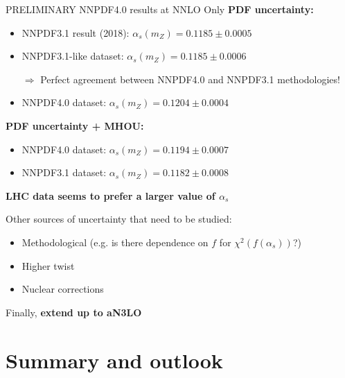 \documentclass[8pt,t]{beamer}
\begin{document}
\begin{frame}{PRELIMINARY NNPDF4.0 results at NNLO}
  Only \textbf{PDF uncertainty:}
  \begin{itemize}
    \item NNPDF3.1 result (2018): $\alpha_s(m_Z) = 0.1185 \pm 0.0005$
    \item NNPDF3.1-like dataset: $\alpha_s(m_Z) = 0.1185 \pm 0.0006$
    \item[$\Rightarrow$] Perfect agreement between NNPDF4.0 and NNPDF3.1 methodologies!
    \item NNPDF4.0 dataset: $\alpha_s(m_Z) = 0.1204 \pm 0.0004$
  \end{itemize}

  \vspace*{1em}
  \textbf{PDF uncertainty + MHOU:}
  \begin{itemize}
    \item NNPDF4.0 dataset: $\alpha_s(m_Z)=0.1194 \pm 0.0007$
    \item NNPDF3.1 dataset: $\alpha_s(m_Z) = 0.1182 \pm 0.0008$
  \end{itemize}

  \vspace*{1em}
  \textbf{LHC data seems to prefer a larger value of $\alpha_s$}

  \vspace*{1em}
  Other sources of uncertainty that need to be studied:
  \begin{itemize}
    \item Methodological (e.g. is there dependence on $f$ for $\chi^2(f(\alpha_s))$?)
    \item Higher twist
    \item Nuclear corrections
  \end{itemize}

  \vspace*{3em}
  \begin{center}
    Finally, \textbf{extend up to aN3LO}
  \end{center}

\end{frame}


\section{Summary and outlook}
\end{document}
